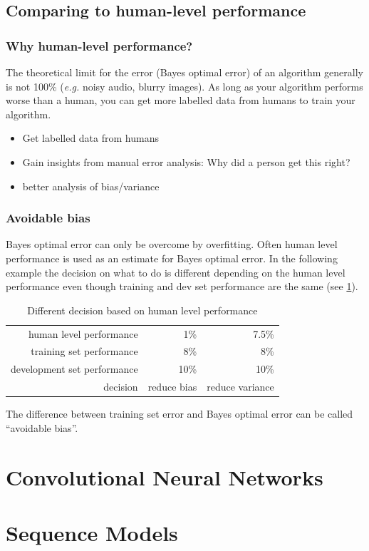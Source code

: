 \documentclass{article}
\begin{document}
\subsection{Comparing to human-level performance}
\subsubsection{Why human-level performance?}
The theoretical limit for the error (Bayes optimal error) of an algorithm generally is not 100\%
(\emph{e.g.} noisy audio, blurry images).
As long as your algorithm performs worse than a human, you can get more labelled data from humans to train your algorithm.
\begin{itemize}
  \item Get labelled data from humans
  \item Gain insights from manual error analysis: Why did a person get this right?
  \item better analysis of bias/variance
\end{itemize}

\subsubsection{Avoidable bias}
Bayes optimal error can only be overcome by overfitting.
Often human level performance is used as an estimate for Bayes optimal error.
In the following example the decision on what to do is different depending on the human level performance
even though training and dev set performance are the same (see \cref{tbl:human}).
\begin{table}[htbp]
  \begin{center}
    \begin{tabular}{r|r|r}
      human level performance     & 1\%  & 7.5\% \\
      training set performance    & 8\%  & 8\%   \\
      development set performance & 10\% & 10\%  \\\hline
      decision & reduce bias & reduce variance
    \end{tabular}
    \caption{Different decision based on human level performance\label{tbl:human}}
  \end{center}
\end{table}
The difference between training set error and Bayes optimal error can be called ``avoidable bias''.

\section{Convolutional Neural Networks}
\section{Sequence Models}
\end{document}
